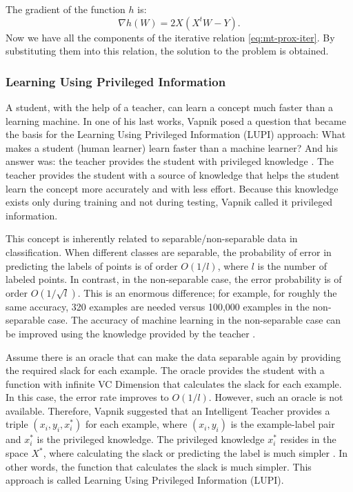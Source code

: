 	The gradient of the function $h$ is:
	\begin{equation}
		\nabla h(W) = 2X(X^t W - Y).
	\end{equation}
	Now we have all the components of the iterative relation \eqref{eq:mt-prox-iter}. By substituting them into this relation, the solution to the problem is obtained.
	
	\subsubsection{Learning Using Privileged Information}
	A student, with the help of a teacher, can learn a concept much faster than a learning machine. In one of his last works, Vapnik posed a question that became the basis for the Learning Using Privileged Information (LUPI) approach: What makes a student (human learner) learn faster than a machine learner? And his answer was: the teacher provides the student with privileged knowledge \cite{vapnik2015learning}. The teacher provides the student with a source of knowledge that helps the student learn the concept more accurately and with less effort. Because this knowledge exists only during training and not during testing, Vapnik called it privileged information.
	
	This concept is inherently related to separable/non-separable data in classification. When different classes are separable, the probability of error in predicting the labels of points is of order $O(1/l)$, where $l$ is the number of labeled points. In contrast, in the non-separable case, the error probability is of order $O(1/\sqrt{l})$. This is an enormous difference; for example, for roughly the same accuracy, 320 examples are needed versus 100,000 examples in the non-separable case. The accuracy of machine learning in the non-separable case can be improved using the knowledge provided by the teacher \cite{vapnik2015learning}.
	
	Assume there is an oracle that can make the data separable again by providing the required slack for each example. The oracle provides the student with a function with infinite VC Dimension that calculates the slack for each example. In this case, the error rate improves to $O(1/l)$. However, such an oracle is not available. Therefore, Vapnik suggested that an Intelligent Teacher provides a triple $(x_i, y_i, x_i^*)$ for each example, where $(x_i, y_i)$ is the example-label pair and $x_i^*$ is the privileged knowledge. The privileged knowledge $x_i^*$ resides in the space $X^*$, where calculating the slack or predicting the label is much simpler \cite{vapnik2015learning}. In other words, the function that calculates the slack is much simpler. This approach is called Learning Using Privileged Information (LUPI).
	
